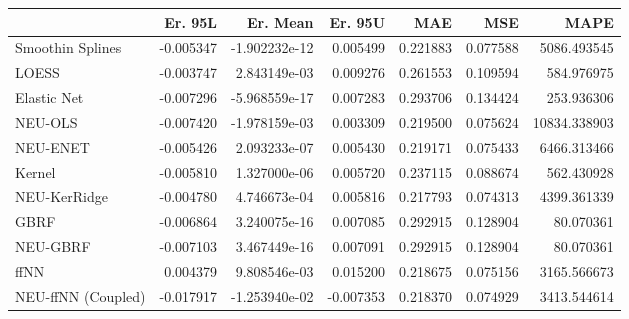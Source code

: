 \begin{tabular}{lrrrrrr}
\toprule
{} &   Er. 95L &      Er. Mean &   Er. 95U &       MAE &       MSE &          MAPE \\
\midrule
Smoothin Splines   & -0.005347 & -1.902232e-12 &  0.005499 &  0.221883 &  0.077588 &   5086.493545 \\
LOESS              & -0.003747 &  2.843149e-03 &  0.009276 &  0.261553 &  0.109594 &    584.976975 \\
Elastic Net        & -0.007296 & -5.968559e-17 &  0.007283 &  0.293706 &  0.134424 &    253.936306 \\
NEU-OLS            & -0.007420 & -1.978159e-03 &  0.003309 &  0.219500 &  0.075624 &  10834.338903 \\
NEU-ENET           & -0.005426 &  2.093233e-07 &  0.005430 &  0.219171 &  0.075433 &   6466.313466 \\
Kernel             & -0.005810 &  1.327000e-06 &  0.005720 &  0.237115 &  0.088674 &    562.430928 \\
NEU-KerRidge       & -0.004780 &  4.746673e-04 &  0.005816 &  0.217793 &  0.074313 &   4399.361339 \\
GBRF               & -0.006864 &  3.240075e-16 &  0.007085 &  0.292915 &  0.128904 &     80.070361 \\
NEU-GBRF           & -0.007103 &  3.467449e-16 &  0.007091 &  0.292915 &  0.128904 &     80.070361 \\
ffNN               &  0.004379 &  9.808546e-03 &  0.015200 &  0.218675 &  0.075156 &   3165.566673 \\
NEU-ffNN (Coupled) & -0.017917 & -1.253940e-02 & -0.007353 &  0.218370 &  0.074929 &   3413.544614 \\
\bottomrule
\end{tabular}
